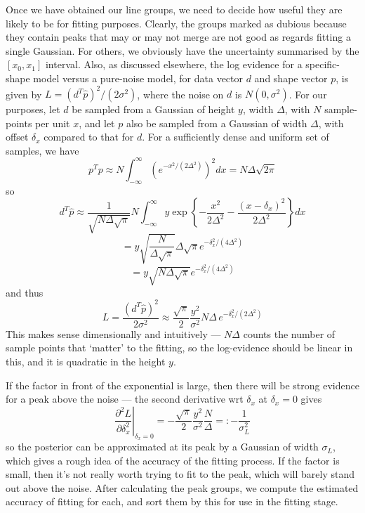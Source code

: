 Once we have obtained our line groups, we need to decide how useful they are
likely to be for fitting purposes. Clearly, the groups marked as dubious
because they contain peaks that may or may not merge are not good as regards
fitting a single Gaussian. For others, we obviously have the uncertainty
summarised by the $[x_0, x_1]$ interval. Also, as discussed elsewhere,
the log evidence for a specific-shape model versus a pure-noise
model, for data vector $d$ and shape vector $p$, is given by $L = (d^T 
\hat p)^2 / (2 \sigma^2)$, where the noise on $d$ is $N(0, \sigma^2)$. 
For our purposes, let $d$ be sampled from a Gaussian of height $y$,
width $\Delta$, with $N$ sample-points per unit $x$,
and let $p$ also be sampled from a Gaussian of width $\Delta$, with
offset $\delta_x$ compared to that for $d$. 
For a sufficiently dense and uniform set of samples, we have 
\[
p^T p \approx N \int_{-\infty}^\infty \left(
e^{-x^2 / (2 \Delta^2)} \right)^2
 dx
= N \Delta \sqrt{2 \pi}
\]
so
\[
d^T \hat p \approx \frac{1}{\sqrt{N \Delta \sqrt{\pi}}} N
\int_{-\infty}^\infty
y \exp\left\{-\frac{x^2}{2 \Delta^2} - \frac{(x-\delta_x)^2}{2 \Delta^2}\right\} dx
\]
\[
= y \sqrt{\frac{N}{\Delta \sqrt{\pi}}} \Delta \sqrt\pi e^{-\delta_x^2 / (4 \Delta^2)}
\]
\[
= y \sqrt{N \Delta \sqrt\pi} e^{-\delta_x^2 / (4 \Delta^2)}
\]
and thus
\[
L = \frac{(d^T \hat p)^2}{2 \sigma^2} \approx 
\frac{\sqrt \pi}{2} \frac{y^2}{\sigma^2} N \Delta  \,
 e^{- \delta_x^2 / (2 \Delta^2)} 
\]
This makes sense dimensionally and intuitively --- $N \Delta$ counts the number
of sample points that `matter' to the fitting, so the log-evidence should be linear
in this, and it is quadratic in the height $y$.

If the factor in front of the exponential is large, then there will be strong
evidence for a peak above the noise --- the second derivative wrt $\delta_x$ at
$\delta_x = 0$ gives
\[
\left.\frac{\partial^2 L}{\partial \delta_x^2} \right|_{\delta_x = 0} = - \frac{\sqrt \pi}{2} \frac{y^2}{\sigma^2}\frac{N}{\Delta} =: - \frac{1}{\sigma_L^2}
\] 
so the posterior can be approximated at its peak by a Gaussian of width
$\sigma_L$, which gives a rough idea of the accuracy of the fitting
process. If the factor is small, then it's not really worth trying to
fit to the peak, which will barely stand out above the noise. After
calculating the peak groups, we compute the estimated accuracy of
fitting for each, and sort them by this for use in the fitting stage.


